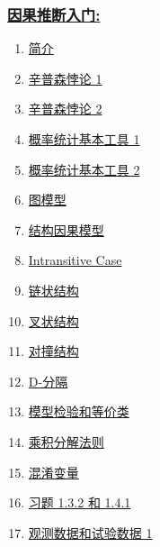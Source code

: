 \documentclass[11pt]{article}
\begin{document}
\subsubsection*{\href{https://space.bilibili.com/491707363/lists/25679?type=season}{\kaishu 因果推断入门:}}

\vspace{-0.5cm}

\begin{multicols}{3}
	\begin{enumerate}
		\item \href{https://mp.weixin.qq.com/s/qroVyHDwNjOEkoLWPTFDwg}{简介}	%
		\item \href{https://mp.weixin.qq.com/s/d4PVqAFXsdeMN-ZWz5aATA}{辛普森悖论 1}	%
		\item \href{https://mp.weixin.qq.com/s/BbGhJG6zVFxo_xPRUMuE9A}{辛普森悖论 2}	%
		\item \href{https://mp.weixin.qq.com/s/nbCWMl-eaTzCjYqGrHSjSA}{概率统计基本工具 1}	%
		\item \href{https://mp.weixin.qq.com/s/_OALIAraHh1kLxz4WM4SDQ}{概率统计基本工具 2}	%
		\item \href{https://mp.weixin.qq.com/s/dJcCR8LJlUKa80lmB8M8eg}{图模型}	%
		\item \href{https://mp.weixin.qq.com/s/ioHaB_aSR5hzQuqjZB_VZQ}{结构因果模型}	%
		\item \href{https://mp.weixin.qq.com/s/D55qKD7w5yLKTjP7_S3wug}{Intransitive Case}	%
		\item \href{https://mp.weixin.qq.com/s/oacDo6ydqp6YERJC-_bQ0Q}{链状结构}	%
		\item \href{https://mp.weixin.qq.com/s/tTwGhY6cnCWgsM9StlBj0A}{叉状结构}	%
		\item \href{https://mp.weixin.qq.com/s/6Uw-RI8G5pmvH71kER392A}{对撞结构}	%
		\item \href{https://mp.weixin.qq.com/s/Q2Um2f-cy_D5s6nEhtFUUA}{D-分隔}	%
		\item \href{https://mp.weixin.qq.com/s/f_DPek3v2I7h2JfsXheCRw}{模型检验和等价类}	%
		\item \href{https://mp.weixin.qq.com/s/Uf2Gvs7y9u7A8STtQQHeCg}{乘积分解法则}	%
		\item \href{https://mp.weixin.qq.com/s/mvpAu4WOkg6PULIncn8MmA}{混淆变量}	%
		\item \href{https://mp.weixin.qq.com/s/EybWLdgnl4cAGdHCFHihUg}{习题 1.3.2 和 1.4.1}	%
		\item \href{https://mp.weixin.qq.com/s/8mBCmaYlAdL-AMISakK3kw}{观测数据和试验数据 1}	%

\end{enumerate}
\end{multicols}
\end{document}

